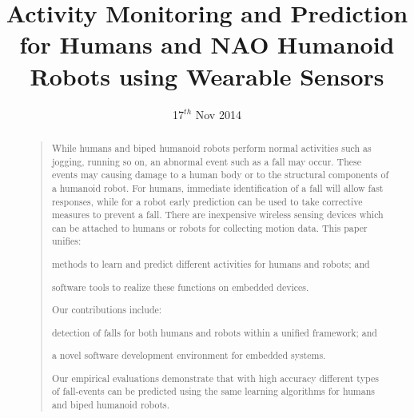 \documentclass[letterpaper]{article}
\begin{document}
 \begin{sloppy}
%
\title{Activity Monitoring and Prediction for Humans and NAO Humanoid Robots using 
Wearable Sensors}
\author{17$^{th}$ Nov 2014 \\ %
}
\maketitle
\begin{abstract}
\begin{quote}
While humans and biped humanoid robots perform normal activities such as jogging, running so on, an 
abnormal event such as a fall may occur. These events may causing damage to a human body or to 
the structural components of a humanoid robot. For humans, immediate identification of a fall will 
allow fast responses, while for a robot early prediction can be used to take corrective measures to 
prevent a fall. There are inexpensive wireless sensing devices which can be  attached to humans or 
robots for collecting motion data. This paper unifies: \begin{inparaenum}[1)] \item 
methods to learn and predict different activities for humans and robots; and \item software 
tools to realize these functions  on embedded devices. \end{inparaenum} Our contributions include: 
\begin{inparaenum}[1)] \item detection of falls for both humans and robots within a unified 
framework; and \item  a  novel software development environment for embedded systems. 
\end{inparaenum} Our empirical evaluations demonstrate that with high accuracy different types of  
fall-events can be predicted using the same learning algorithms for humans and biped humanoid 
robots. 
\end{quote}
\end{abstract}


\end{sloppy}
\end{document}
